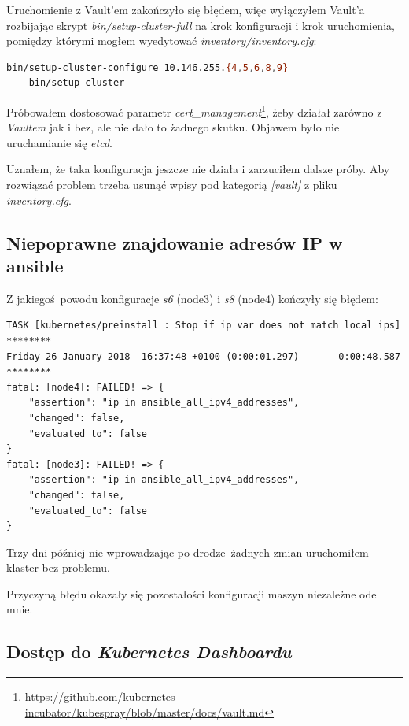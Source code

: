 \documentclass[a4paper,12pt,twoside,openany]{report}
\DeclareRobustCommand{\href}[2]{#2\footnote{\url{#1}}}
\begin{document}
Uruchomienie z Vault'em zakończyło się błędem, więc wyłączyłem Vault'a
rozbijając skrypt \emph{bin/setup-cluster-full} na krok konfiguracji i
krok uruchomienia, pomiędzy którymi mogłem wyedytować
\emph{inventory/inventory.cfg}:

\begin{lstlisting}[language=bash]
    bin/setup-cluster-configure 10.146.255.{4,5,6,8,9}
    bin/setup-cluster
\end{lstlisting}

Próbowałem dostosować parametr
\href{https://github.com/kubernetes-incubator/kubespray/blob/master/docs/vault.md}{\emph{cert\_management}},
żeby działał zarówno z \emph{Vaultem} jak i bez, ale nie dało to żadnego
skutku. Objawem było nie uruchamianie się \emph{etcd}.

Uznałem, że taka konfiguracja jeszcze nie działa i zarzuciłem dalsze
próby. Aby rozwiązać problem trzeba usunąć wpisy pod kategorią
\emph{{[}vault{]}} z pliku \emph{inventory.cfg}.

\hypertarget{niepoprawne-znajdowanie-adresuxf3w-ip-w-ansible}{%
\subsection{Niepoprawne znajdowanie adresów IP w
ansible}\label{niepoprawne-znajdowanie-adresuxf3w-ip-w-ansible}}

Z jakiegoś~powodu konfiguracje \emph{s6} (node3) i \emph{s8} (node4)
kończyły się błędem:

\begin{lstlisting}
TASK [kubernetes/preinstall : Stop if ip var does not match local ips] ********
Friday 26 January 2018  16:37:48 +0100 (0:00:01.297)       0:00:48.587 ********
fatal: [node4]: FAILED! => {
    "assertion": "ip in ansible_all_ipv4_addresses",
    "changed": false,
    "evaluated_to": false
}
fatal: [node3]: FAILED! => {
    "assertion": "ip in ansible_all_ipv4_addresses",
    "changed": false,
    "evaluated_to": false
}
\end{lstlisting}

Trzy dni później nie wprowadzając po drodze~żadnych zmian uruchomiłem
klaster bez problemu.

Przyczyną błędu okazały się pozostałości konfiguracji maszyn niezależne
ode mnie.

\hypertarget{dostux119p-do-kubernetes-dashboardu}{%
\subsection{\texorpdfstring{Dostęp do \emph{Kubernetes
Dashboardu}}{Dostęp do Kubernetes Dashboardu}}\label{dostux119p-do-kubernetes-dashboardu}}
\end{document}
